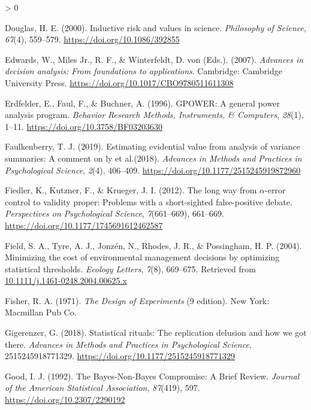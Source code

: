 \documentclass[
  english,
  ,man, a4paper,floatsintext]{apa6}
\newlength{\cslhangindent}
\newenvironment{CSLReferences}[2] %
 {%
  \setlength{\parindent}{0pt}
  \ifodd #1 \everypar{\setlength{\hangindent}{\cslhangindent}}\ignorespaces\fi
  \ifnum #2 > 0
  \setlength{\parskip}{#2\baselineskip}
  \fi
 }%
 {}
\begin{document}
\begin{CSLReferences}{1}{0}
\leavevmode\hypertarget{ref-douglas_inductive_2000}{}%
Douglas, H. E. (2000). Inductive risk and values in science. \emph{Philosophy of Science}, \emph{67}(4), 559--579. \url{https://doi.org/10.1086/392855}

\leavevmode\hypertarget{ref-edwards_advances_2007}{}%
Edwards, W., Miles Jr., R. F., \& Winterfeldt, D. von (Eds.). (2007). \emph{Advances in decision analysis: {From} foundations to applications}. Cambridge: Cambridge University Press. \url{https://doi.org/10.1017/CBO9780511611308}

\leavevmode\hypertarget{ref-erdfelder_gpower_1996}{}%
Erdfelder, E., Faul, F., \& Buchner, A. (1996). {GPOWER}: {A} general power analysis program. \emph{Behavior Research Methods, Instruments, \& Computers}, \emph{28}(1), 1--11. \url{https://doi.org/10.3758/BF03203630}

\leavevmode\hypertarget{ref-faulkenberry2019estimating}{}%
Faulkenberry, T. J. (2019). Estimating evidential value from analysis of variance summaries: A comment on ly et al.(2018). \emph{Advances in Methods and Practices in Psychological Science}, \emph{2}(4), 406--409. \url{https://doi.org/10.1177/2515245919872960}

\leavevmode\hypertarget{ref-fiedler_long_2012}{}%
Fiedler, K., Kutzner, F., \& Krueger, J. I. (2012). The long way from {\(\alpha\)}-error control to validity proper: {Problems with} a short-sighted false-positive debate. \emph{Perspectives on Psychological Science}, \emph{7}(661--669), 661--669. \url{https://doi.org/10.1177/1745691612462587}

\leavevmode\hypertarget{ref-field_minimizing_2004}{}%
Field, S. A., Tyre, A. J., Jonzén, N., Rhodes, J. R., \& Possingham, H. P. (2004). Minimizing the cost of environmental management decisions by optimizing statistical thresholds. \emph{Ecology Letters}, \emph{7}(8), 669--675. Retrieved from \href{https://10.1111/j.1461-0248.2004.00625.x}{10.1111/j.1461-0248.2004.00625.x}

\leavevmode\hypertarget{ref-fisher_design_1971}{}%
Fisher, R. A. (1971). \emph{The {Design} of {Experiments}} (9 edition). New York: Macmillan Pub Co.

\leavevmode\hypertarget{ref-gigerenzer_statistical_2018}{}%
Gigerenzer, G. (2018). Statistical rituals: The replication delusion and how we got there. \emph{Advances in Methods and Practices in Psychological Science}, 2515245918771329. \url{https://doi.org/10.1177/2515245918771329}

\leavevmode\hypertarget{ref-good_bayes-non-bayes_1992}{}%
Good, I. J. (1992). The {Bayes}-{Non}-{Bayes Compromise}: {A Brief Review}. \emph{Journal of the American Statistical Association}, \emph{87}(419), 597. \url{https://doi.org/10.2307/2290192}


\end{CSLReferences}
\end{document}
